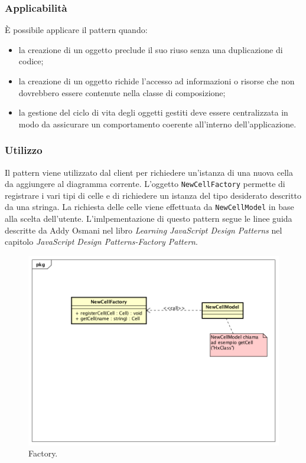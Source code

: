 \subsubsection{Applicabilità} È possibile applicare il pattern quando:
\begin{itemize}
	\item la creazione di un oggetto preclude il suo riuso senza una duplicazione di codice;
	\item la creazione di un oggetto richide l'accesso ad informazioni o risorse che non dovrebbero essere contenute nella classe di composizione;
	\item la gestione del ciclo di vita degli oggetti gestiti deve essere centralizzata in modo da assicurare un comportamento coerente all'interno dell'applicazione.
\end{itemize}

\subsubsection{Utilizzo}
Il pattern viene utilizzato dal client per richiedere un'istanza di una nuova cella da aggiungere al diagramma corrente. L'oggetto \texttt{NewCellFactory} permette di registrare i vari tipi di celle e di richiedere un istanza del tipo desiderato descritto da una stringa. La richiesta delle celle viene effettuata da \texttt{NewCellModel} in base alla scelta dell'utente.
L'imlpementazione di questo pattern segue le linee guida descritte da Addy Osmani nel libro \emph{Learning JavaScript Design Patterns} nel capitolo \emph{JavaScript Design Patterns-Factory Pattern}.
\begin{figure}[H] \label{fig:factory}
	\includegraphics[scale=0.4]{img/factoryExample.png}
	\caption{Factory.}
\end{figure}

